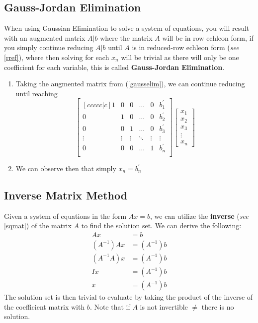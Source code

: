 \documentclass[a4paper]{article}
\begin{document}
  \subsection{Gauss-Jordan Elimination}
  When using Gaussian Elimination to solve a system of equations, you will result with an augmented matrix $A|b$ where the matrix $A$ will be in row echleon form, if you simply continue reducing $A|b$ until $A$ is in reduced-row echleon form (\textit{see} \ref{rref}), where then solving for each $x_n$ will be trivial as there will only be one coefficient for each variable, this is called \textbf{Gauss-Jordan Elimination}.
  \begin{enumerate}
    \item Taking the augmented matrix from (\ref{gausselim}), we can continue reducing until reaching
      \[
        \begin{bmatrix}[ccccc|c]
          1 & 0 & 0& \dots & 0 & b_1^\prime\\
          0 & 1 & 0&\dots & 0 & b_2^\prime\\
          0 & 0 & 1&\dots & 0 & b_3^\prime\\
          \vdots & \vdots & \vdots&\ddots & \vdots& \vdots\\
          0 & 0 & 0&\dots & 1 & b_n^\prime\\
        \end{bmatrix}
        \begin{bmatrix}
         x_1 \\ x_2 \\ x_3 \\ \vdots \\ x_n 
        \end{bmatrix}
      \]
    \item We can observe then that simply $x_n = b_n^\prime$
  \end{enumerate}
  \subsection{Inverse Matrix Method }
  Given a system of equations in the form $Ax=b$, we can utilize the \textbf{inverse} (\textit{see }\ref{sqmat}) of the matrix $A$ to find the solution set. We can derive the following:
  \begin{equation}
    \begin{aligned}
      Ax&=b \\
      (A^{-1})Ax &=(A^{-1})b\\
      (A^{-1}A)x &= (A^{-1})b\\
      Ix &= (A^{-1})b\\
      x &= (A^{-1})b
    \end{aligned}
  \end{equation}
  The solution set is then trivial to evaluate by taking the product of the inverse of the coefficient matrix with $b$. Note that if $A$ is not invertible $\neq$ there is no solution.
\end{document}
